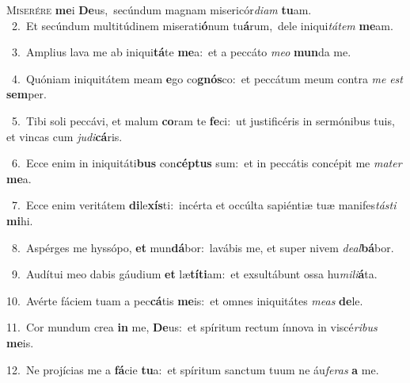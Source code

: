 \lettrine{\initial\textcolor{\initialcolor}{M}}{iserére} \textbf{me}\-i \textbf{De}\-us,~\star secúndum magnam misericór\-\textit{di}\-\textit{am} \textbf{tu}\-am.\\
{\numbfont\textcolor{\numbcolor}{~2.}}~Et secúndum multitúdinem miserati\-\textbf{ó}\-num tu\-\textbf{á}\-rum,~\star dele iniqui\-\textit{tá}\-\textit{tem} \textbf{me}\-am.\par
{\numbfont\textcolor{\numbcolor}{~3.}}~Amplius lava me ab iniqui\-\textbf{tá}\-te \textbf{me}\-a:~\star et a peccáto \textit{me}\-\textit{o} \textbf{mun}\-da me.\par
{\numbfont\textcolor{\numbcolor}{~4.}}~Quóniam iniquitátem meam \textbf{e}\-go co\-\textbf{gnós}\-co:~\star et peccátum meum contra \textit{me} \textit{est} \textbf{sem}\-per.\par
{\numbfont\textcolor{\numbcolor}{~5.}}~Tibi soli peccávi, et malum \textbf{co}\-ram te \textbf{fe}\-ci:~\star ut justificéris in sermónibus tuis, et vincas cum \textit{ju}\-\textit{di}\textbf{cá}ris.\par
{\numbfont\textcolor{\numbcolor}{~6.}}~Ecce enim in iniquitáti\textbf{bus} con\-\textbf{cép}\-\textbf{tus} sum:~\star et in peccátis concépit me \textit{ma}\-\textit{ter} \textbf{me}\-a.\par
{\numbfont\textcolor{\numbcolor}{~7.}}~Ecce enim veritátem \textbf{di}\-le\-\textbf{xís}\-ti:~\star incérta et occúlta sapiéntiæ tuæ manifes\-\textit{tás}\-\textit{ti} \textbf{mi}\-hi.\par
{\numbfont\textcolor{\numbcolor}{~8.}}~Aspérges me hyssópo, \textbf{et} mun\-\textbf{dá}\-bor:~\star lavábis me, et super nivem \textit{de}\-\textit{al}\textbf{bá}bor.\par
{\numbfont\textcolor{\numbcolor}{~9.}}~Audítui meo dabis gáudium \textbf{et} læ\-\textbf{tí}\-\textbf{ti}am:~\star et exsultábunt ossa hu\-\textit{mi}\-\textit{li}\textbf{á}ta.\par
{\numbfont\textcolor{\numbcolor}{10.}}~Avérte fáciem tuam a pec\-\textbf{cá}\-tis \textbf{me}\-is:~\star et omnes iniquitátes \textit{me}\-\textit{as} \textbf{de}\-le.\par
{\numbfont\textcolor{\numbcolor}{11.}}~Cor mundum crea \textbf{in} me, \textbf{De}\-us:~\star et spíritum rectum ínnova in viscé\-\textit{ri}\-\textit{bus} \textbf{me}\-is.\par
{\numbfont\textcolor{\numbcolor}{12.}}~Ne projícias me a \textbf{fá}\-cie \textbf{tu}\-a:~\star et spíritum sanctum tuum ne áu\-\textit{fe}\-\textit{ras} \textbf{a} me.\par
